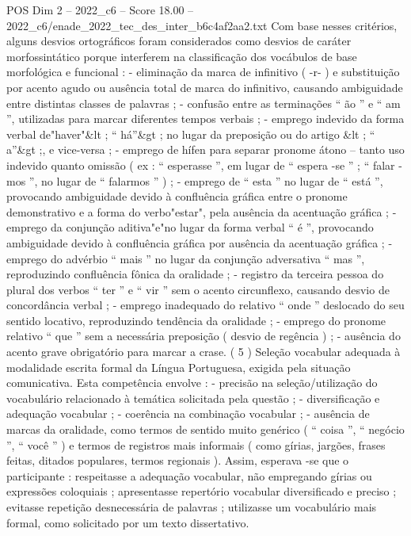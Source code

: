 \begin{textsample}{POS Dim 2 – 2022\_c6 – Score 18.00 – 2022\_c6/enade\_2022\_tec\_des\_inter\_b6c4af2aa2.txt}
Com base nesses critérios, alguns desvios ortográficos foram considerados como desvios de caráter morfossintático porque interferem na classificação dos vocábulos de base morfológica e funcional : - eliminação da marca de infinitivo ( -r- ) e substituição por acento agudo ou ausência total de marca do infinitivo, causando ambiguidade entre distintas classes de palavras ; - confusão entre as terminações “ ão ” e “ am ”, utilizadas para marcar diferentes tempos verbais ; - emprego indevido da forma verbal de"haver"\&lt ; “ há”\&gt ; no lugar da preposição ou do artigo \&lt ; “ a”\&gt ;, e vice-versa ; - emprego de hífen para separar pronome átono – tanto uso indevido quanto omissão ( ex : “ esperasse ”, em lugar de “ espera -se ” ; “ falar -mos ”, no lugar de “ falarmos ” ) ; - emprego de “ esta ” no lugar de “ está ”, provocando ambiguidade devido à confluência gráfica entre o pronome demonstrativo e a forma do verbo"estar", pela ausência da acentuação gráfica ; - emprego da conjunção aditiva"e"no lugar da forma verbal “ é ”, provocando ambiguidade devido à confluência gráfica por ausência da acentuação gráfica ; - emprego do advérbio “ mais ” no lugar da conjunção adversativa “ mas ”, reproduzindo confluência fônica da oralidade ; - registro da terceira pessoa do plural dos verbos “ ter ” e “ vir ” sem o acento circunflexo, causando desvio de concordância verbal ; - emprego inadequado do relativo “ onde ” deslocado do seu sentido locativo, reproduzindo tendência da oralidade ; - emprego do pronome relativo “ que ” sem a necessária preposição ( desvio de regência ) ; - ausência do acento grave obrigatório para marcar a crase. ( 5 ) Seleção vocabular adequada à modalidade escrita formal da Língua Portuguesa, exigida pela situação comunicativa.
Esta competência envolve : - precisão na seleção/utilização do vocabulário relacionado à temática solicitada pela questão ; - diversificação e adequação vocabular ; - coerência na combinação vocabular ; - ausência de marcas da oralidade, como termos de sentido muito genérico ( “ coisa ”, “ negócio ”, “ você ” ) e termos de registros mais informais ( como gírias, jargões, frases feitas, ditados populares, termos regionais ).
Assim, esperava -se que o participante : respeitasse a adequação vocabular, não empregando gírias ou expressões coloquiais ; apresentasse repertório vocabular diversificado e preciso ; evitasse repetição desnecessária de palavras ; utilizasse um vocabulário mais formal, como solicitado por um texto dissertativo.

\end{textsample}
